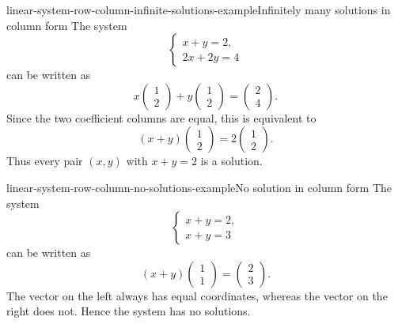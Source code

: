 \documentclass[preview]{standalone}
\begin{document}
\begin{snippetexample}{linear-system-row-column-infinite-solutions-example}{Infinitely many solutions in column form}
    The system
    \[
        \begin{cases}
            x+y=2,\\
            2x+2y=4
        \end{cases}
    \]
    can be written as
    \[
        x
        \begin{pmatrix}
            1\\
            2
        \end{pmatrix}
        +
        y
        \begin{pmatrix}
            1\\
            2
        \end{pmatrix}
        =
        \begin{pmatrix}
            2\\
            4
        \end{pmatrix}.
    \]
    Since the two coefficient columns are equal, this is equivalent to
    \[
        (x+y)
        \begin{pmatrix}
            1\\
            2
        \end{pmatrix}
        =
        2
        \begin{pmatrix}
            1\\
            2
        \end{pmatrix}.
    \]
    Thus every pair \((x,y)\) with \(x+y=2\) is a solution.
\end{snippetexample}

\begin{snippetexample}{linear-system-row-column-no-solutions-example}{No solution in column form}
    The system
    \[
        \begin{cases}
            x+y=2,\\
            x+y=3
        \end{cases}
    \]
    can be written as
    \[
        (x+y)
        \begin{pmatrix}
            1\\
            1
        \end{pmatrix}
        =
        \begin{pmatrix}
            2\\
            3
        \end{pmatrix}.
    \]
    The vector on the left always has equal coordinates, whereas the vector
    on the right does not. Hence the system has no solutions.
\end{snippetexample}
\end{document}
